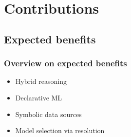 \documentclass[presentation]{beamer}\mode<presentation>{\usetheme{AMSBolognaFC}}
\begin{document}
\section{Contributions}

\subsection{Expected benefits}

\begin{frame}%
\frametitle{Overview on expected benefits}

    \begin{itemize}
        \item Hybrid reasoning
    
        \item Declarative ML
    
        \item Symbolic data sources
    
        \item Model selection via resolution
    
    \end{itemize}

\end{frame}
\end{document}
